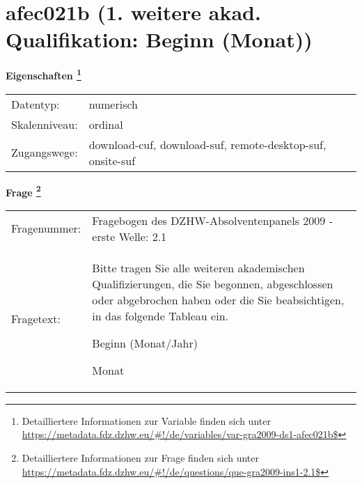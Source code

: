 
    \setcounter{footnote}{0}

    \vspace*{-1.8cm}
	\section{afec021b (1. weitere akad. Qualifikation: Beginn (Monat))}
	\label{section:afec021b}



    \vspace*{0.5cm}
    \noindent\textbf{Eigenschaften
	\footnote{Detailliertere Informationen zur Variable finden sich unter
		\url{https://metadata.fdz.dzhw.eu/\#!/de/variables/var-gra2009-ds1-afec021b$}}}\\
	\begin{tabularx}{\hsize}{@{}lX}
	Datentyp: & numerisch \\
	Skalenniveau: & ordinal \\
	Zugangswege: &
	  download-cuf, 
	  download-suf, 
	  remote-desktop-suf, 
	  onsite-suf
 \\
    \end{tabularx}



				\vspace*{0.5cm}
                \noindent\textbf{Frage
	                \footnote{Detailliertere Informationen zur Frage finden sich unter
		              \url{https://metadata.fdz.dzhw.eu/\#!/de/questions/que-gra2009-ins1-2.1$}}}\\
				\begin{tabularx}{\hsize}{@{}lX}
					Fragenummer: &
					  Fragebogen des DZHW-Absolventenpanels 2009 - erste Welle:
					  2.1
 \\
					Fragetext: & Bitte tragen Sie alle weiteren akademischen Qualifizierungen, die Sie begonnen, abgeschlossen oder abgebrochen haben oder die Sie beabsichtigen, in das folgende Tableau ein.\par  Beginn (Monat/Jahr)\par  Monat \\
				\end{tabularx}





